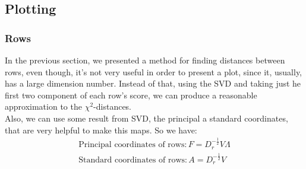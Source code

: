 \documentclass[12pt]{extarticle}
\numberwithin{equation}{section}
\begin{document}
\subsection{Plotting}
\subsubsection{Rows}
In the previous section, we presented a method for finding distances between rows, even though, it's not very useful in order to present a plot, since it, usually, has a large dimension number.  Instead of that, using the SVD and taking just he first two component of each row's score, we can produce a reasonable approximation to the $\chi^2$-distances.\\
Also, we can use some result from SVD, the principal a standard coordinates, that are very helpful to make this maps. So we have: \\
\begin{align*}
\text{Principal coordinates of rows}:  F = D_r^{-\frac{1}{2}} V\Lambda \\
\text{Standard coordinates of rows}:  A = D_r^{-\frac{1}{2}} V 
\end{align*}
\\
\end{document}
